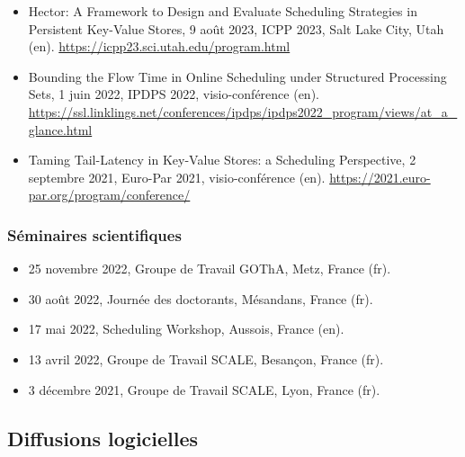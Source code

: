 \documentclass[12pt]{article}
\begin{document}
\begin{itemize}
    \item \foreignlanguage{english}{Hector: A Framework to Design and Evaluate Scheduling Strategies
    in Persistent Key-Value Stores}, 9 août 2023, ICPP 2023, Salt Lake City, Utah (en).
    \url{https://icpp23.sci.utah.edu/program.html}
    \item \foreignlanguage{english}{Bounding the Flow Time in Online Scheduling under Structured
    Processing Sets}, 1 juin 2022, IPDPS 2022, visio-conférence (en).
    \url{https://ssl.linklings.net/conferences/ipdps/ipdps2022_program/views/at_a_glance.html}
    \item \foreignlanguage{english}{Taming Tail-Latency in Key-Value Stores: a Scheduling
    Perspective}, 2 septembre 2021, Euro-Par 2021, visio-conférence (en).
    \url{https://2021.euro-par.org/program/conference/}
\end{itemize}

\subsubsection*{Séminaires scientifiques}

\begin{itemize}
  \item 25 novembre 2022, Groupe de Travail GOThA, Metz, France (fr).
  \item 30 août 2022, Journée des doctorants, Mésandans, France (fr).
  \item 17 mai 2022, Scheduling Workshop, Aussois, France (en).
  \item 13 avril 2022, Groupe de Travail SCALE, Besançon, France (fr).
  \item 3 décembre 2021, Groupe de Travail SCALE, Lyon, France (fr).
\end{itemize}

\subsection{Diffusions logicielles}
\end{document}
